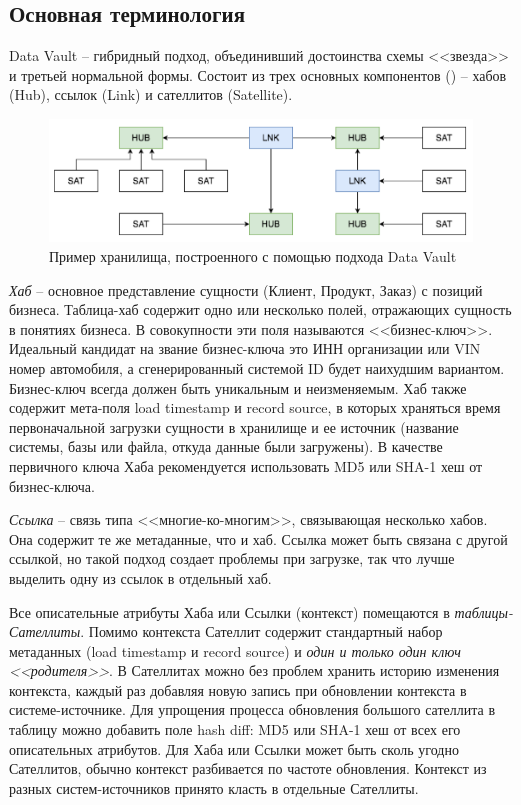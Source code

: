 \documentclass[%
	11pt,
	a4paper,
	utf8,
		]{article}
\begin{document}
\subsection{Основная терминология}

Data Vault -- гибридный подход, объединивший достоинства схемы <<звезда>> и третьей нормальной формы. Состоит из трех основных компонентов () -- хабов (Hub), ссылок (Link) и сателлитов (Satellite).

\begin{figure}[h]
	\centering
	\includegraphics[scale=0.65]{figures/base_scheme_data_vault.png}
	\caption{ Пример хранилища, построенного с помощью подхода Data Vault }\label{fig:base_scheme_data_vault}
\end{figure}


\emph{Хаб} -- основное представление сущности (Клиент, Продукт, Заказ) с позиций бизнеса. Таблица-хаб содержит одно или несколько полей, отражающих сущность в понятиях бизнеса. В совокупности эти поля называются <<бизнес-ключ>>. Идеальный кандидат на звание бизнес-ключа это ИНН организации или VIN номер автомобиля, а сгенерированный системой ID будет наихудшим вариантом. Бизнес-ключ всегда должен быть уникальным и неизменяемым. Хаб также содержит мета-поля load timestamp и record source, в которых храняться время первоначальной загрузки сущности в хранилище и ее источник (название системы, базы или файла, откуда данные были загружены). В качестве первичного ключа Хаба рекомендуется использовать MD5 или SHA-1 хеш от бизнес-ключа.

\emph{Ссылка} -- связь типа <<многие-ко-многим>>, связывающая несколько хабов. Она содержит те же метаданные, что и хаб. Ссылка может быть связана с другой ссылкой, но такой подход создает проблемы при загрузке, так что лучше выделить одну из ссылок в отдельный хаб.

Все описательные атрибуты Хаба или Ссылки (контекст) помещаются в \emph{таблицы-Сателлиты}. Помимо контекста Сателлит содержит стандартный набор метаданных (load timestamp и record source) и \emph{один и только один ключ <<родителя>>}. В Сателлитах можно без проблем хранить историю изменения контекста, каждый раз добавляя новую запись при обновлении контекста в системе-источнике. Для упрощения процесса обновления большого сателлита в таблицу можно добавить поле hash diff: MD5 или SHA-1 хеш от всех его описательных атрибутов. Для Хаба или Ссылки может быть сколь угодно Сателлитов, обычно контекст разбивается по частоте обновления. Контекст из разных систем-источников принято класть в отдельные Сателлиты.
\end{document}
